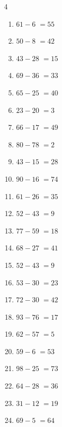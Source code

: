 \begin{multicols}{4}
\begin{enumerate}
  \item $61-6$
        $=55$

  \item $50-8$
        $=42$

  \item $43-28$
        $=15$

  \item $69-36$
        $=33$

  \item $65-25$
        $=40$

  \item $23-20$
        $=3$

  \item $66-17$
        $=49$

  \item $80-78$
        $=2$

  \item $43-15$
        $=28$

  \item $90-16$
        $=74$

  \item $61-26$
        $=35$

  \item $52-43$
        $=9$

  \item $77-59$
        $=18$

  \item $68-27$
        $=41$

  \item $52-43$
        $=9$

  \item $53-30$
        $=23$

  \item $72-30$
        $=42$

  \item $93-76$
        $=17$

  \item $62-57$
        $=5$

  \item $59-6$
        $=53$

  \item $98-25$
        $=73$

  \item $64-28$
        $=36$

  \item $31-12$
        $=19$

  \item $69-5$
        $=64$


\end{enumerate}
\end{multicols}
